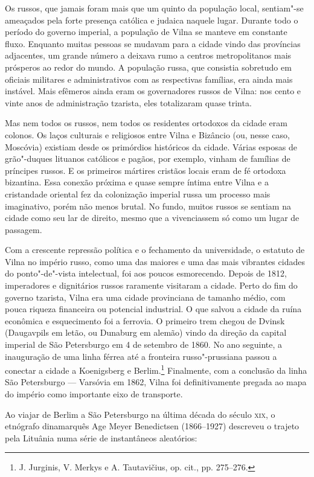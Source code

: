 Os russos, que jamais foram mais que um quinto da população local,
sentiam"-se ameaçados pela forte presença católica e judaica naquele
lugar. Durante todo o período do governo imperial, a população de Vilna
se manteve em constante fluxo. Enquanto muitas pessoas se mudavam para a
cidade vindo das províncias adjacentes, um grande número a deixava rumo
a centros metropolitanos mais prósperos ao redor do mundo. A população
russa, que consistia sobretudo em oficiais militares e administrativos
com as respectivas famílias, era ainda mais instável. Mais efêmeros
ainda eram os governadores russos de Vilna: nos cento e vinte anos de
administração tzarista, eles totalizaram quase trinta.

Mas nem todos os russos, nem todos os residentes ortodoxos da cidade
eram colonos. Os laços culturais e religiosos entre Vilna e Bizâncio
(ou, nesse caso, Moscóvia) existiam desde os primórdios históricos da
cidade. Várias esposas de grão"-duques lituanos católicos e pagãos, por
exemplo, vinham de famílias de príncipes russos. E os primeiros mártires
cristãos locais eram de fé ortodoxa bizantina. Essa conexão próxima e
quase sempre íntima entre Vilna e a cristandade oriental fez da
colonização imperial russa um processo mais imaginativo, porém não menos
brutal. No fundo, muitos russos se sentiam na cidade como seu lar de
direito, mesmo que a vivenciassem só como um lugar de passagem.

Com a crescente repressão política e o fechamento da universidade, o
estatuto de Vilna no império russo, como uma das maiores e uma das mais
vibrantes cidades do ponto"-de"-vista intelectual, foi aos poucos
esmorecendo. Depois de 1812, imperadores e dignitários russos raramente
visitaram a cidade. Perto do fim do governo tzarista, Vilna era uma
cidade provinciana de tamanho médio, com pouca riqueza financeira ou
potencial industrial. O que salvou a cidade da ruína econômica e
esquecimento foi a ferrovia. O primeiro trem chegou de Dvinsk
(Daugavpils em letão, ou Dunaburg em alemão) vindo da direção da capital
imperial de São Petersburgo em 4 de setembro de 1860. No ano seguinte, a
inauguração de uma linha férrea até a fronteira russo"-prussiana passou a
conectar a cidade a Koenigsberg e Berlim.\footnote{J. Jurginis, V. Merkys e A. Tautavičius, op. cit., pp. 275--276.} Finalmente, com a conclusão da linha São Petersburgo --- Varsóvia em 1862, Vilna foi
definitivamente pregada ao mapa do império como importante eixo de
transporte.

\asterisc

Ao viajar de Berlim a São Petersburgo na última década do século \textsc{xix}, o
etnógrafo dinamarquês Age Meyer Benedictsen (1866--1927) descreveu o
trajeto pela Lituânia numa série de instantâneos aleatórios:

